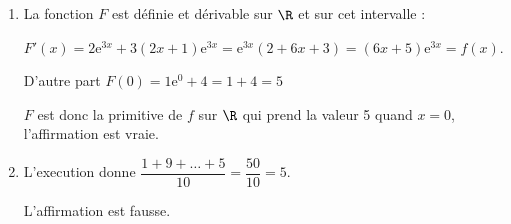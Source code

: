 \begin{enumerate}
\item La fonction $F$ est définie et dérivable sur $\R$ et sur cet intervalle :

$F'(x) = 2\text{e}^{3x} + 3(2x + 1)\text{e}^{3x} = \text{e}^{3x}(2 + 6x + 3) = (6x + 5)\text{e}^{3x} = f(x)$.

D'autre part $F(0) = 1\text{e}^{0} + 4 = 1 + 4 = 5$

$F$ est donc la primitive de $f$ sur $\R$ qui prend la valeur 5 quand $x = 0$, l'affirmation est vraie.
\item L'execution donne $\dfrac{1 + 9 + \ldots + 5}{10} = \dfrac{50}{10} = 5$.

L'affirmation est fausse.
\end{enumerate}

\bigskip
